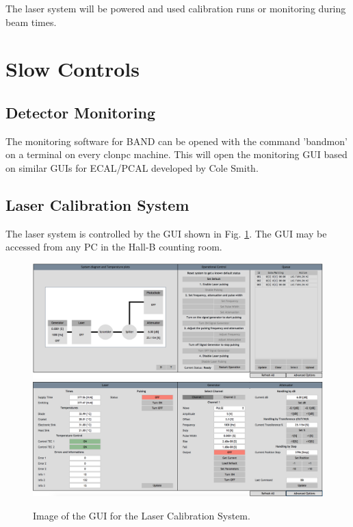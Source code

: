 \documentclass[12pt,letterpaper]{article}
\begin{document}
The laser system will be powered and used calibration runs or monitoring during beam times.

\section{Slow Controls}

\subsection{Detector Monitoring}
\label{ssec:guimonitoring}
The monitoring software for BAND can be opened with the command 'bandmon' on a terminal on every clonpc machine. This will open the monitoring GUI based on similar GUIs for ECAL/PCAL developed by Cole Smith. 
\subsection{Laser Calibration System}

The laser system is controlled by the GUI shown in Fig. \ref{fig:LaserMenu}. The GUI may be accessed from any PC in the Hall-B counting room.
\begin{figure}
\centering
{\includegraphics[width=.9\textwidth]{laserscreen_basic.png}}
{\includegraphics[width=.9\textwidth]{laserscreen_adv.png}}

\caption{Image of the GUI for the Laser Calibration System.}
\label{fig:LaserMenu}
\end{figure}
\end{document}
